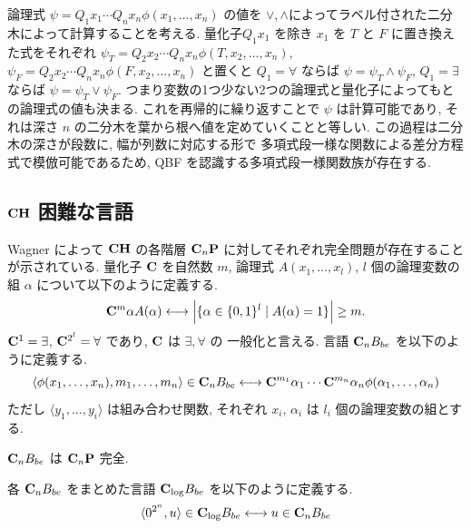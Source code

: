 論理式 $\psi = Q_1 x_1 \cdots Q_n x_n \phi(x_1, \dots, x_n)$ の値を
$\vee, \wedge$によってラベル付された二分木によって計算することを考える. 
量化子$Q_1 x_1$ を除き $x_1$ を $T$ と $F$ に置き換えた式をそれぞれ
$\psi_T = Q_2 x_2 \cdots Q_n x_n \phi(T, x_2, \dots, x_n)$,
$\psi_F = Q_2 x_2 \cdots Q_n x_n \phi(F, x_2, \dots, x_n)$ と置くと
$Q_1=\forall$ ならば $\psi = \psi_T \wedge \psi_F$, 
$Q_1=\exists$ ならば $\psi = \psi_T \vee \psi_F$.
つまり変数の1つ少ない2つの論理式と量化子によってもとの論理式の値も決まる.
これを再帰的に繰り返すことで $\psi$ は計算可能であり, 
それは深さ $n$ の二分木を葉から根へ値を定めていくことと等しい.
この過程は二分木の深さが段数に, 幅が列数に対応する形で
多項式段一様な関数による差分方程式で模倣可能であるため,
\textsf{QBF} を認識する多項式段一様関数族が存在する.



\subsection{$\mathbf{CH}$ 困難な言語}

Wagner によって $\mathbf{CH}$ の各階層 $\mathbf{C}_n \mathbf{P}$ に対してそれぞれ完全問題が存在することが示されている\cite{wagner1986complexity}.
量化子 $\mathbf{C}$ を自然数 $m$, 論理式 $A(x_1, \dots, x_l)$, 
$l$ 個の論理変数の組 $\alpha$ について以下のように定義する.
\begin{equation}
 \mathbf{C}^m \alpha A(\alpha) 
  \longleftrightarrow 
  \Bigl|\{\alpha \in \{0,1\}^l \mid A(\alpha) = 1\}\Bigr| \ge m.
\end{equation}
$\mathbf{C}^1 = \exists$, $\mathbf{C}^{2^l} = \forall$ であり, $\mathbf{C}$ は $\exists, \forall$ の
一般化と言える.
言語 $\mathbf{C}_n B_{be}$ を以下のように定義する.
\begin{equation}
 \langle \phi(x_1, \dots, x_n), m_1, \dots, m_n \rangle \in \mathbf{C}_n B_{be}
 \longleftrightarrow
 \mathbf{C}^{m_1}{\alpha_1} \cdots \mathbf{C}^{m_n}{\alpha_n} \phi(\alpha_1, \dots, \alpha_n) 
\end{equation}
ただし $\langle y_1, \dots, y_i \rangle$ は組み合わせ関数,
それぞれ $x_i$, $\alpha_i$ は $l_i$ 個の論理変数の組とする.


\begin{lemma} \label{lemma:CnP-complete}
 $\mathbf{C}_n B_{be}$ は $\mathbf{C}_n\mathbf{P}$ 完全.
\end{lemma}


各 $\mathbf{C}_n B_{be}$ をまとめた言語 $\mathbf{C}_{\log} B_{be}$ を以下のように定義する.
\[
 \langle 0^{2^n}, u \rangle \in \mathbf{C}_{\log} B_{be}
 \longleftrightarrow
 u \in \mathbf{C}_n B_{be}
\]


